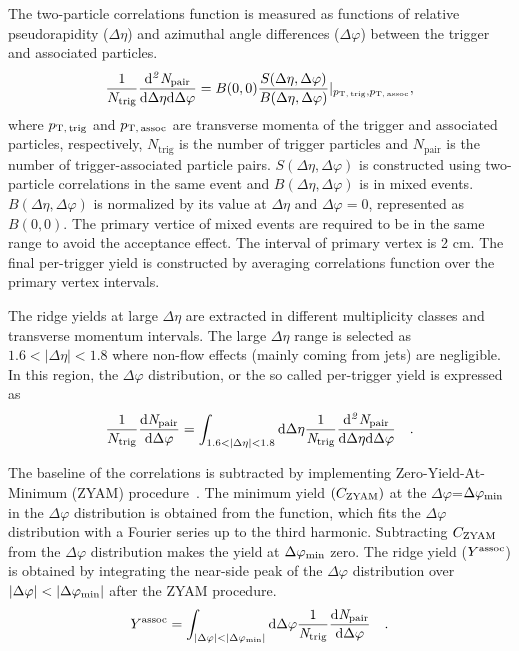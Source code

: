 The two-particle correlations function is measured as functions of relative pseudorapidity ($\Delta\eta$) and azimuthal angle differences ($\Delta\varphi$) between the trigger and associated particles.
\begin{eqnarray}
\frac{1}{N_{\rm{trig}}} \frac{ \rm{d}\it{}^{2} N_{\rm{pair}} }{ \rm{d} \Delta\eta \rm{d}\Delta\varphi} = B(0, 0)\frac{S(\Delta\eta, \Delta\varphi)}{B(\Delta\eta, \Delta\varphi)} \lvert_{p_\mathrm{T,\,trig},p_\mathrm{T,\,assoc}}  , 
\label{eq:corrfunction}
\end{eqnarray}
where  $p_\mathrm{T,\,trig}$ and $p_\mathrm{T,\,assoc}$ are transverse momenta of the trigger and associated particles, respectively, $N_\mathrm{trig}$ is the number of trigger particles and $N_\mathrm{pair}$ is the number of trigger-associated particle pairs. $S (\Delta\eta, \Delta\varphi)$ is constructed using two-particle correlations in the same event and $B(\Delta\eta, \Delta\varphi)$ is in mixed events. $B(\Delta\eta, \Delta\varphi)$ is normalized by its value at $\Delta\eta$ and $\Delta\varphi = 0$, represented as $B (0,0)$. The primary vertice of mixed events are required to be in the same range to avoid the acceptance effect. The interval of primary vertex is 2 cm. The final per-trigger yield is constructed by averaging correlations function over the primary vertex intervals.

The ridge yields at large $\Delta\eta$ are extracted in different multiplicity classes and transverse momentum intervals. The large $\Delta\eta$ range is selected as $1.6<|\Delta\eta|<1.8$ where non-flow effects (mainly coming from jets) are negligible. In this region, the $\Delta\varphi$ distribution, or the so called per-trigger yield is expressed as
\begin{eqnarray}
\frac{1}{N_{\rm{trig}}} \frac{ \rm{d}\it{}N_{\rm{pair}} }{ \rm{d}\Delta\varphi } = \int_{1.6<|\Delta \eta|<1.8} \rm{d} \Delta \eta \frac{1}{\it{N}_{\rm{trig}}} \frac{ \rm{d}\it{}^{2} N_{\rm{pair}} }{ \rm{d}\Delta\eta d\Delta\varphi} \quad.
\end{eqnarray}

The baseline of the correlations is subtracted by implementing Zero-Yield-At-Minimum (ZYAM) procedure~\cite{Ajitanand:2005jj}. The minimum yield $(C_{\rm{ZYAM}})$ at the $\Delta\varphi$=$\Delta\varphi_{\rm{min}}$ in the $\Delta\varphi$ distribution is obtained from the function, which fits the $\Delta\varphi$ distribution with a Fourier series up to the third harmonic. Subtracting $C_{\rm{ZYAM}}$ from the $\Delta\varphi$ distribution makes the yield at $\Delta\varphi_{\rm{min}}$ zero. The ridge yield ($Y^{\rm{assoc}}$) is obtained by integrating the near-side peak of the $\Delta\varphi$ distribution over $|\Delta\varphi|<|\Delta\varphi_{\rm{min}}|$ after the ZYAM procedure.
\begin{eqnarray}
Y^{\rm{assoc}} = \int_{|\Delta \varphi| < |\Delta\varphi_{\rm{min}}| } \rm{d} \Delta\varphi \frac{1}{\it{N}_{\rm{trig}}} \frac{ \rm{d}\it{}N_{\rm{pair}} }{ \rm{d}\Delta\varphi } \quad.
\end{eqnarray}

